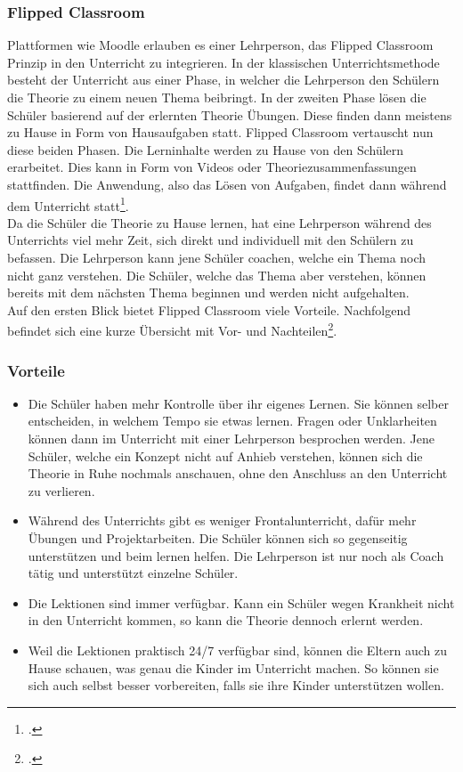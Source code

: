 \subsubsection{Flipped Classroom}
Plattformen wie Moodle erlauben es einer Lehrperson, das Flipped Classroom Prinzip in den Unterricht zu integrieren. In der klassischen Unterrichtsmethode besteht der Unterricht aus einer Phase, in welcher die Lehrperson den Schülern die Theorie zu einem neuen Thema beibringt. In der zweiten Phase lösen die Schüler basierend auf der erlernten Theorie Übungen. Diese finden dann meistens zu Hause in Form von Hausaufgaben statt. Flipped Classroom vertauscht nun diese beiden Phasen. Die Lerninhalte werden zu Hause von den Schülern erarbeitet. Dies kann in Form von Videos oder Theoriezusammenfassungen stattfinden. Die Anwendung, also das Lösen von Aufgaben, findet dann während dem Unterricht statt\footcite{flipped_classroom_theorie}. \\

Da die Schüler die Theorie zu Hause lernen, hat eine Lehrperson während des Unterrichts viel mehr Zeit, sich direkt und individuell mit den Schülern zu befassen. Die Lehrperson kann jene Schüler coachen, welche ein Thema noch nicht ganz verstehen. Die Schüler, welche das Thema aber verstehen, können bereits mit dem nächsten Thema beginnen und werden nicht aufgehalten. \\

Auf den ersten Blick bietet Flipped Classroom viele Vorteile. Nachfolgend befindet sich eine kurze Übersicht mit Vor- und Nachteilen\footcite{flipped_classroom_pro_con}.

\newpage
\subsubsection*{Vorteile}
\begin{itemize}
	\item Die Schüler haben mehr Kontrolle über ihr eigenes Lernen. Sie können selber entscheiden, in welchem Tempo sie etwas lernen. Fragen oder Unklarheiten können dann im Unterricht mit einer Lehrperson besprochen werden. Jene Schüler, welche ein Konzept nicht auf Anhieb verstehen, können sich die Theorie in Ruhe nochmals anschauen, ohne den Anschluss an den Unterricht zu verlieren.
	\item Während des Unterrichts gibt es weniger Frontalunterricht, dafür mehr Übungen und Projektarbeiten. Die Schüler können sich so gegenseitig unterstützen und beim lernen helfen. Die Lehrperson ist nur noch als Coach tätig und unterstützt einzelne Schüler.
	\item Die Lektionen sind immer verfügbar. Kann ein Schüler wegen Krankheit nicht in den Unterricht kommen, so kann die Theorie dennoch erlernt werden. 
	\item Weil die Lektionen praktisch 24/7 verfügbar sind, können die Eltern auch zu Hause schauen, was genau die Kinder im Unterricht machen. So können sie sich auch selbst besser vorbereiten, falls sie ihre Kinder unterstützen wollen. 
\end{itemize}

